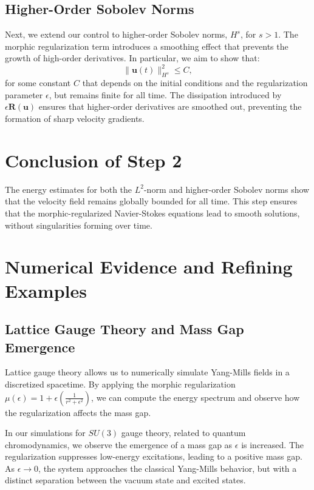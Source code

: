 \documentclass{article}
\begin{document}
\subsection*{Higher-Order Sobolev Norms}

Next, we extend our control to higher-order Sobolev norms, \( H^s \), for \( s > 1 \). The morphic regularization term introduces a smoothing effect that prevents the growth of high-order derivatives. In particular, we aim to show that:
\[
\|\mathbf{u}(t)\|_{H^s}^2 \leq C,
\]
for some constant \( C \) that depends on the initial conditions and the regularization parameter \( \epsilon \), but remains finite for all time. The dissipation introduced by \( \epsilon \mathbf{R}(\mathbf{u}) \) ensures that higher-order derivatives are smoothed out, preventing the formation of sharp velocity gradients.

\section*{Conclusion of Step 2}

The energy estimates for both the \( L^2 \)-norm and higher-order Sobolev norms show that the velocity field remains globally bounded for all time. This step ensures that the morphic-regularized Navier-Stokes equations lead to smooth solutions, without singularities forming over time.

\section*{Numerical Evidence and Refining Examples}

\subsection*{Lattice Gauge Theory and Mass Gap Emergence}

Lattice gauge theory allows us to numerically simulate Yang-Mills fields in a discretized spacetime. By applying the morphic regularization \( \mu(\epsilon) = 1 + \epsilon \left( \frac{1}{r^2 + \epsilon^2} \right) \), we can compute the energy spectrum and observe how the regularization affects the mass gap.

In our simulations for \( SU(3) \) gauge theory, related to quantum chromodynamics, we observe the emergence of a mass gap as \( \epsilon \) is increased. The regularization suppresses low-energy excitations, leading to a positive mass gap. As \( \epsilon \to 0 \), the system approaches the classical Yang-Mills behavior, but with a distinct separation between the vacuum state and excited states.
\end{document}
